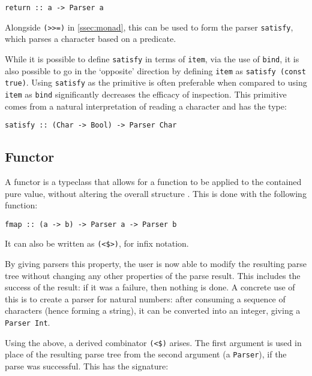 \begin{verbatim}
return :: a -> Parser a
\end{verbatim}

Alongside \texttt{(>{}>=)} in \autoref{ssec:monad}, this can be used to form the parser \texttt{satisfy}, which parses a character based on a predicate.

While it is possible to define \texttt{satisfy} in terms of \texttt{item}, via the use of \texttt{bind}, it is also possible to go in the `opposite' direction by defining \texttt{item} as \texttt{satisfy (const true)}.
Using \texttt{satisfy} as the primitive is often preferable when compared to using \texttt{item} as \texttt{bind} significantly decreases the efficacy of inspection.
This primitive comes from a natural interpretation of reading a character and has the type:

\begin{verbatim}
satisfy :: (Char -> Bool) -> Parser Char
\end{verbatim}

\subsection{Functor}
\label{ssec:functor}

A functor is a typeclass that allows for a function to be applied to the contained pure value, without altering the overall structure \cite{allen2016haskell}.
This is done with the following function:

\begin{verbatim}
fmap :: (a -> b) -> Parser a -> Parser b
\end{verbatim}

It can also be written as \texttt{(<\$>)}, for infix notation.

By giving parsers this property, the user is now able to modify the resulting parse tree without changing any other properties of the parse result.
This includes the success of the result: if it was a failure, then nothing is done.
A concrete use of this is to create a parser for natural numbers: after consuming a sequence of characters (hence forming a string), it can be converted into an integer, giving a \texttt{Parser Int}.

Using the above, a derived combinator \texttt{(<\$)} arises.
The first argument is used in place of the resulting parse tree from the second argument (a \texttt{Parser}), if the parse was successful.
This has the signature:

